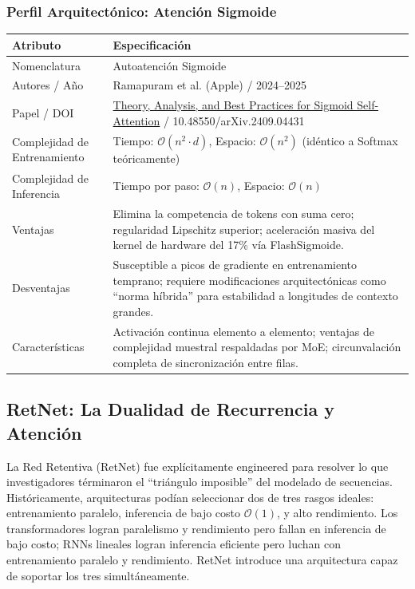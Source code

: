 \documentclass[11pt,a4paper]{article}
\begin{document}
\subsubsection{Perfil Arquitectónico: Atención Sigmoide}

\begin{center}
\begin{tabular}{|l|p{11cm}|}
\hline
\textbf{Atributo} & \textbf{Especificación} \\
\hline
Nomenclatura & Autoatención Sigmoide \\
\hline
Autores / Año & Ramapuram et al. (Apple) / 2024--2025 \\
\hline
Papel / DOI & \href{https://arxiv.org/abs/2409.04431}{Theory, Analysis, and Best Practices for Sigmoid Self-Attention} / 10.48550/arXiv.2409.04431 \\
\hline
Complejidad de Entrenamiento & Tiempo: $\mathcal{O}(n^2 \cdot d)$, Espacio: $\mathcal{O}(n^2)$ (idéntico a Softmax teóricamente) \\
\hline
Complejidad de Inferencia & Tiempo por paso: $\mathcal{O}(n)$, Espacio: $\mathcal{O}(n)$ \\
\hline
Ventajas & Elimina la competencia de tokens con suma cero; regularidad Lipschitz superior; aceleración masiva del kernel de hardware del 17\% vía FlashSigmoide. \\
\hline
Desventajas & Susceptible a picos de gradiente en entrenamiento temprano; requiere modificaciones arquitectónicas como ``norma híbrida'' para estabilidad a longitudes de contexto grandes. \\
\hline
Características & Activación continua elemento a elemento; ventajas de complejidad muestral respaldadas por MoE; circunvalación completa de sincronización entre filas. \\
\hline
\end{tabular}
\end{center}

\subsection{RetNet: La Dualidad de Recurrencia y Atención}
\label{subsec:retnet}

La Red Retentiva (RetNet) fue explícitamente engineered para resolver lo que investigadores términaron el ``triángulo imposible'' del modelado de secuencias. Históricamente, arquitecturas podían seleccionar dos de tres rasgos ideales: entrenamiento paralelo, inferencia de bajo costo $\mathcal{O}(1)$, y alto rendimiento. Los transformadores logran paralelismo y rendimiento pero fallan en inferencia de bajo costo; RNNs lineales logran inferencia eficiente pero luchan con entrenamiento paralelo y rendimiento. RetNet introduce una arquitectura capaz de soportar los tres simultáneamente.
\end{document}
